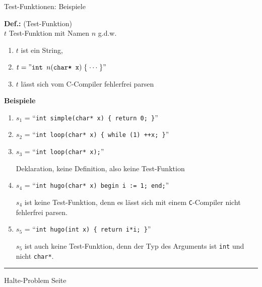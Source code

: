 \documentclass{slides}
\newcounter{mypage}
\begin{document}
\begin{slide}{}
 \begin{center}
Test-Funktionen: Beispiele
\end{center}

\footnotesize
\textbf{Def.:} (Test-Funktion) \\[0.3cm]
$t$ Test-Funktion mit Namen $n$ g.d.w.
\begin{enumerate}
\item $t$ ist ein String,
\item $t = \symbol{34}\texttt{int }n(\texttt{char* x})\; \{ \;\cdots\; \}\symbol{34}$ 
\item $t$ l\"asst sich vom C-Compiler fehlerfrei parsen
\end{enumerate}

\textbf{Beispiele}
\begin{enumerate}
\item $s_1$ = ``{\tt int simple(char* x) \{ return 0; \}}''
\item $s_2$ = ``{\tt int loop(char* x) \{ while (1) ++x; \}}''
\item $s_3$ = ``{\tt int loop(char* x);}''

      Deklaration, keine Definition, also keine Test-Funktion
\item $s_4$ = ``{\tt int hugo(char* x) begin i := 1; end;}''

      $s_4$ ist keine Test-Funktion, denn es l\"asst sich mit einem
      \texttt{C}-Compiler nicht fehlerfrei parsen.
\item $s_5$ = ``{\tt int hugo(int x) \{ return i*i; \}}''

      $s_5$ ist auch keine Test-Funktion, denn der Typ des Arguments ist \texttt{int}
      und nicht \texttt{char*}.
\end{enumerate}

\vspace*{\fill}
\tiny \addtocounter{mypage}{1}
\rule{17cm}{1mm}
Halte-Problem  \hspace*{\fill} Seite 
\end{slide}
\end{document}
